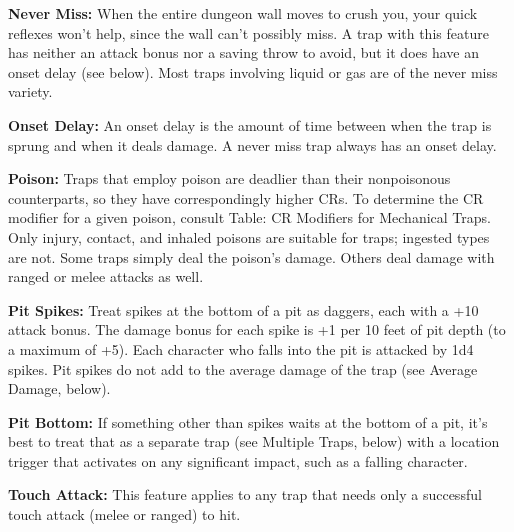 \textbf{Never Miss:} When the entire dungeon wall moves to crush you, your quick reflexes won't help, since the wall can't possibly miss. A trap with this feature has neither an attack bonus nor a saving throw to avoid, but it does have an onset delay (see below). Most traps involving liquid or gas are of the never miss variety.

\textbf{Onset Delay:} An onset delay is the amount of time between when the trap is sprung and when it deals damage. A never miss trap always has an onset delay.

\textbf{Poison:} Traps that employ poison are deadlier than their nonpoisonous counterparts, so they have correspondingly higher CRs. To determine the CR modifier for a given poison, consult Table: CR Modifiers for Mechanical Traps. Only injury, contact, and inhaled poisons are suitable for traps; ingested types are not. Some traps simply deal the poison's damage. Others deal damage with ranged or melee attacks as well.

\textbf{Pit Spikes:} Treat spikes at the bottom of a pit as daggers, each with a +10 attack bonus. The damage bonus for each spike is +1 per 10 feet of pit depth (to a maximum of +5). Each character who falls into the pit is attacked by 1d4 spikes. Pit spikes do not add to the average damage of the trap (see Average Damage, below).

\textbf{Pit Bottom:} If something other than spikes waits at the bottom of a pit, it's best to treat that as a separate trap (see Multiple Traps, below) with a location trigger that activates on any significant impact, such as a falling character.

\textbf{Touch Attack:} This feature applies to any trap that needs only a successful touch attack (melee or ranged) to hit.
